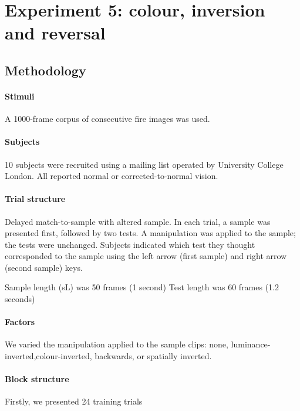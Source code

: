 \section{Experiment 5: colour, inversion and reversal}

\subsection{Methodology}


\paragraph{Stimuli}

A 1000-frame corpus of consecutive fire images was used.



\paragraph{Subjects}

10 subjects were recruited using a mailing list operated by University College London. All reported normal or corrected-to-normal vision.

\paragraph{Trial structure}

Delayed match-to-sample with altered sample.
In each trial, a sample was presented first, followed by two tests. A manipulation was applied to the sample; the tests were unchanged. Subjects indicated which test they thought corresponded to the sample using the left arrow (first sample) and right arrow (second sample) keys. 

Sample length (sL) was 50 frames (1 second)
Test length was 60 frames (1.2 seconds)

\paragraph{Factors}

We varied the manipulation applied to the sample clips:
none, luminance-inverted,colour-inverted, backwards, or spatially inverted.

\paragraph{Block structure}

Firstly, we presented 24 training trials


